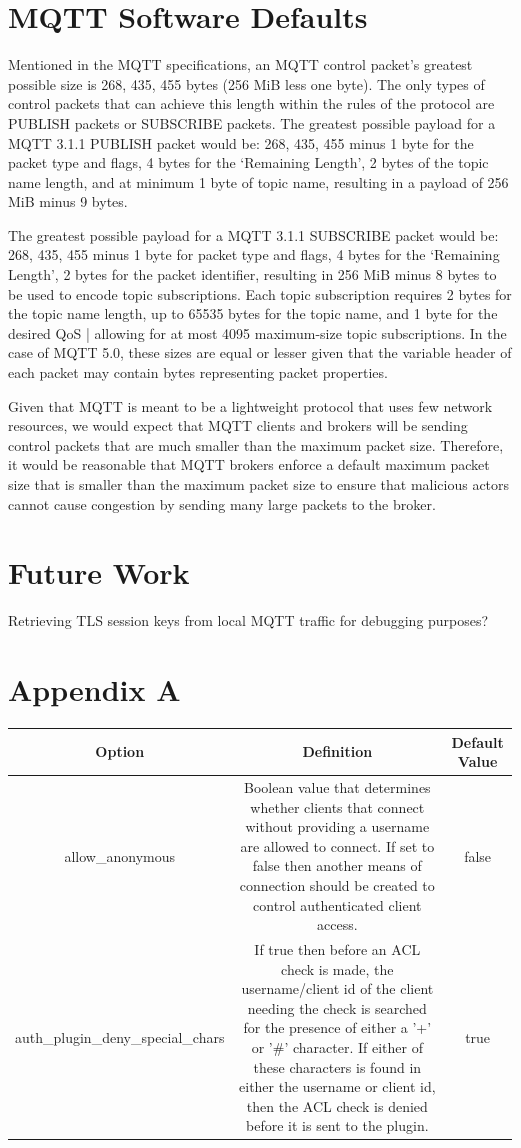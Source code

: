 \documentclass[12pt]{article}
\begin{document}
\section*{MQTT Software Defaults}
Mentioned in the MQTT specifications, an MQTT control packet's greatest possible size is 268, 435, 455 bytes (256 MiB less one byte). The only types of control packets that can achieve this length within the rules of the protocol are PUBLISH packets or SUBSCRIBE packets. The greatest possible payload for a MQTT 3.1.1 PUBLISH packet would be: 268, 435, 455 minus 1 byte for the packet type and flags, 4 bytes for the `Remaining Length', 2 bytes of the topic name length, and at minimum 1 byte of topic name, resulting in a payload of 256 MiB minus 9 bytes.\par
The greatest possible payload for a MQTT 3.1.1 SUBSCRIBE packet would be: 268, 435, 455 minus 1 byte for packet type and flags, 4 bytes for the `Remaining Length', 2 bytes for the packet identifier, resulting in 256 MiB minus 8 bytes to be used to encode topic subscriptions. Each topic subscription requires 2 bytes for the topic name length, up to 65535 bytes for the topic name, and 1 byte for the desired QoS | allowing for at most 4095 maximum-size topic subscriptions. In the case of MQTT 5.0, these sizes are equal or lesser given that the variable header of each packet may contain bytes representing packet properties.\par
Given that MQTT is meant to be a lightweight protocol that uses few network resources, we would expect that MQTT clients and brokers will be sending control packets that are much smaller than the maximum packet size. Therefore, it would be reasonable that MQTT brokers enforce a default maximum packet size that is smaller than the maximum packet size to ensure that malicious actors cannot cause congestion by sending many large packets to the broker. 

\section*{Future Work}
Retrieving TLS session keys from local MQTT traffic for debugging purposes?
\section*{Appendix A}
\begin{tabulary}{\textwidth}{cCc}
\hline
Option & Definition & Default Value\\
\hline
allow\_anonymous & Boolean value that determines whether clients that connect without providing a username are allowed to connect. If set to false then another means of connection should be created to control authenticated client access. & false\\
auth\_plugin\_deny\_special\_chars & If true then before an ACL check is made, the username/client id of the client needing the check is searched for the presence of either a '+' or '\#' character. If either of these characters is found in either the username or client id, then the ACL check is denied before it is sent to the plugin. & true\\

\end{tabulary}


\end{document}
